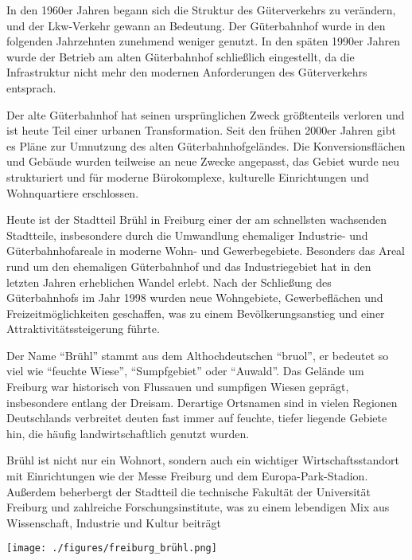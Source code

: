 \documentclass[landscape, a4paper]{article}
\begin{document}
\begin{minipage}[t]{0.32\textwidth}
  In den 1960er Jahren begann sich die Struktur des Güterverkehrs zu verändern, und der Lkw-Verkehr gewann an Bedeutung. Der Güterbahnhof wurde in den folgenden Jahrzehnten zunehmend weniger genutzt. In den späten 1990er Jahren wurde der Betrieb am alten Güterbahnhof schließlich eingestellt, da die Infrastruktur nicht mehr den modernen Anforderungen des Güterverkehrs entsprach.

	Der alte Güterbahnhof hat seinen ursprünglichen Zweck größtenteils verloren und ist heute Teil einer urbanen Transformation. Seit den frühen 2000er Jahren gibt es Pläne zur Umnutzung des alten Güterbahnhofgeländes. Die Konversionsflächen und Gebäude wurden teilweise an neue Zwecke angepasst, das Gebiet wurde neu strukturiert und für moderne Bürokomplexe, kulturelle Einrichtungen und Wohnquartiere erschlossen. %

  Heute ist der Stadtteil Brühl in Freiburg einer der am schnellsten wachsenden Stadtteile, insbesondere durch die Umwandlung ehemaliger Industrie- und Güterbahnhofareale in moderne Wohn- und Gewerbegebiete. Besonders das Areal rund um den ehemaligen Güterbahnhof und das Industriegebiet hat in den letzten Jahren erheblichen Wandel erlebt. Nach der Schließung des Güterbahnhofs im Jahr 1998 wurden neue Wohngebiete, Gewerbeflächen und Freizeitmöglichkeiten geschaffen, was zu einem Bevölkerungsanstieg und einer Attraktivitätssteigerung führte. 


\end{minipage}
\hspace{0.4cm}
\begin{minipage}[t]{0.32\textwidth}
	\vspace{0cm}
	\setlength{\parskip}{0.25cm}

	Der Name \enquote{Brühl} stammt aus dem Althochdeutschen \enquote{bruol}, er bedeutet so viel wie \enquote{feuchte Wiese}, \enquote{Sumpfgebiet} oder \enquote{Auwald}. Das Gelände um Freiburg war historisch von Flussauen und sumpfigen Wiesen geprägt, insbesondere entlang der Dreisam. Derartige Ortsnamen sind in vielen Regionen Deutschlands verbreitet deuten fast immer auf feuchte, tiefer liegende Gebiete hin, die häufig landwirtschaftlich genutzt wurden.

  Brühl ist nicht nur ein Wohnort, sondern auch ein wichtiger Wirtschaftsstandort mit Einrichtungen wie der Messe Freiburg und dem Europa-Park-Stadion. Außerdem beherbergt der Stadtteil die technische Fakultät der Universität Freiburg und zahlreiche Forschungsinstitute, was zu einem lebendigen Mix aus Wissenschaft, Industrie und Kultur beiträgt

	\texttt{[image: ./figures/freiburg\_brühl.png]}
	\setlength{\parskip}{0.25cm}
\end{minipage}
\end{document}
